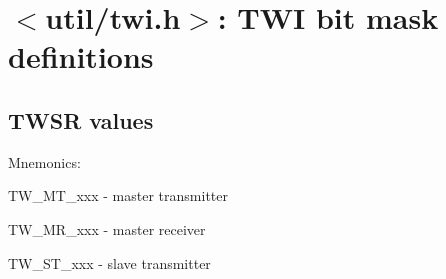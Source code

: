 \hypertarget{group__util__twi}{
\section{$<$util/twi.h$>$: TWI bit mask definitions}
\label{group__util__twi}
}
\subsection*{TWSR values}
\label{_amgrp42f820ba9b5b7097b4fd1e83955bb8fc}
 Mnemonics: \par
TW\_\-MT\_\-xxx -\/ master transmitter \par
TW\_\-MR\_\-xxx -\/ master receiver \par
TW\_\-ST\_\-xxx -\/ slave transmitter \par

